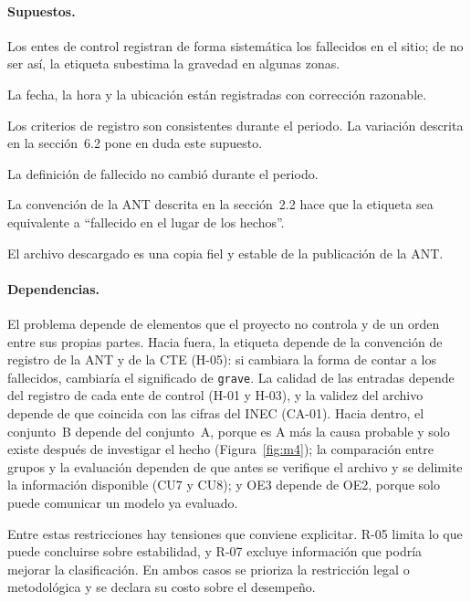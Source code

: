 \paragraph{Supuestos.}

\begin{description}[leftmargin=1.6em,style=nextline,itemsep=0.25em]
\item[H-01.] Los entes de control registran de forma sistemática los fallecidos en el sitio; de no ser así, la etiqueta subestima la gravedad en algunas zonas.
\item[H-02.] La fecha, la hora y la ubicación están registradas con corrección razonable.
\item[H-03.] Los criterios de registro son consistentes durante el periodo. La variación descrita en la sección~6.2 pone en duda este supuesto.
\item[H-04.] La definición de fallecido no cambió durante el periodo.
\item[H-05.] La convención de la ANT descrita en la sección~2.2 hace que la etiqueta sea equivalente a ``fallecido en el lugar de los hechos''.
\item[H-06.] El archivo descargado es una copia fiel y estable de la publicación de la ANT.
\end{description}

\paragraph{Dependencias.} El problema depende de elementos que el proyecto no controla y de un orden entre sus propias partes. Hacia fuera, la etiqueta depende de la convención de registro de la ANT y de la CTE (H-05): si cambiara la forma de contar a los fallecidos, cambiaría el significado de \texttt{grave}. La calidad de las entradas depende del registro de cada ente de control (H-01 y H-03), y la validez del archivo depende de que coincida con las cifras del INEC (CA-01). Hacia dentro, el conjunto~B depende del conjunto~A, porque es A más la causa probable y solo existe después de investigar el hecho (Figura~\ref{fig:m4}); la comparación entre grupos y la evaluación dependen de que antes se verifique el archivo y se delimite la información disponible (CU7 y CU8); y OE3 depende de OE2, porque solo puede comunicar un modelo ya evaluado.

Entre estas restricciones hay tensiones que conviene explicitar. R-05 limita lo que puede concluirse sobre estabilidad, y R-07 excluye información que podría mejorar la clasificación. En ambos casos se prioriza la restricción legal o metodológica y se declara su costo sobre el desempeño.
